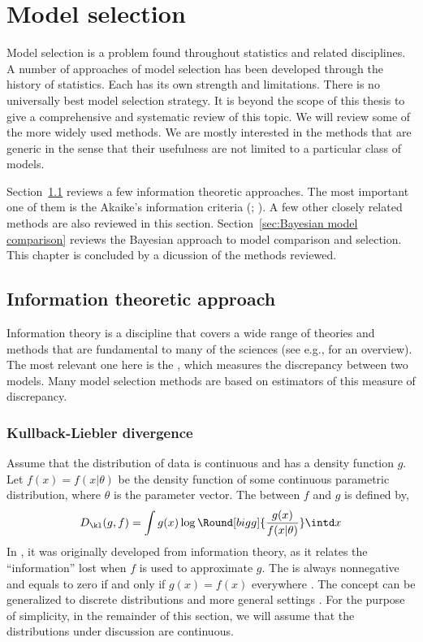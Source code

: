 \chapter{Model selection}
\label{cha:Model selection}

Model selection is a problem found throughout statistics and related
disciplines. A number of approaches of model selection has been developed
through the history of statistics. Each has its own strength and
limitations.  There is no universally best model selection strategy. It is
beyond the scope of this thesis to give a comprehensive and systematic review
of this topic. We will review some of the more widely used methods. We are
mostly interested in the methods that are generic in the sense that their
usefulness are not limited to a particular class of models.

Section~\ref{sec:Information theoretic approach} reviews a few information
theoretic approaches. The most important one of them is the Akaike's
information criteria (\aic; \cite{Akaike:1973uc,Akaike:1974ih}). A few other
closely related methods are also reviewed in this section.
Section~\ref{sec:Bayesian model comparison} reviews the Bayesian approach to
model comparison and selection. This chapter is concluded by a dicussion of
the methods reviewed.

\section{Information theoretic approach}
\label{sec:Information theoretic approach}

Information theory is a discipline that covers a wide range of theories and
methods that are fundamental to many of the sciences (see e.g.,
\cite{Cover:1991vx} for an overview). The most relevant one here is the \kld
\cite{Kullback:1951va}, which measures the discrepancy between two models.
Many model selection methods are based on estimators of this measure of
discrepancy.

\subsection{Kullback-Liebler divergence}
\label{sub:Kullback-Liebler divergence}

Assume that the distribution of data is continuous and has a density function
$g$. Let $f(x) = f(x|\theta)$ be the density function of some continuous
parametric distribution, where $\theta$ is the parameter vector. The \kld
between $f$ and $g$ is defined by,
\begin{equation}
  D_{\kl}(g,f) = \int g(x)\log\Round[bigg]{\frac{g(x)}{f(x|\theta)}}\intd x
  \label{eq:kl}
\end{equation}
In \cite{Kullback:1951va}, it was originally developed from information
theory, as it relates the ``information'' lost when $f$ is used to
approximate $g$. The \kld is always nonnegative and equals to zero if and
only if $g(x) = f(x)$ everywhere \cite[][sec.~6.8]{Burnham:2002wc}. The
concept can be generalized to discrete distributions and more general
settings \cite[][sec.~2.1.3]{Burnham:2002wc}. For the purpose of simplicity,
in the remainder of this section, we will assume that the distributions under
discussion are continuous.


